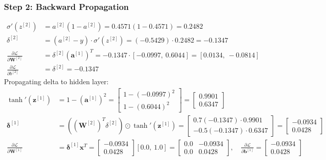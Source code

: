 \documentclass[11pt,a4paper]{article}
\begin{document}
\subsubsection{Step 2: Backward Propagation}
\begin{align*}
    \sigma'(z^{[2]}) &= a^{[2]}(1 - a^{[2]}) = 0.4571(1 - 0.4571) = 0.2482 \\
    \delta^{[2]} &= (a^{[2]} - y) \cdot \sigma'(z^{[2]}) = (-0.5429) \cdot 0.2482 = -0.1347 \\
    \frac{\partial \mathcal{L}}{\partial \mathbf{W}^{[2]}} &= \delta^{[2]} (\mathbf{a}^{[1]})^T = -0.1347 \cdot [-0.0997, \ 0.6044] = [0.0134, \ -0.0814] \\
    \frac{\partial \mathcal{L}}{\partial b^{[2]}} &= \delta^{[2]} = -0.1347
\end{align*}
Propagating delta to hidden layer:
\begin{align*}
    \tanh'(\mathbf{z}^{[1]}) &= 1 - (\mathbf{a}^{[1]})^2 = \begin{bmatrix} 1 - (-0.0997)^2 \\ 1 - (0.6044)^2 \end{bmatrix} = \begin{bmatrix} 0.9901 \\ 0.6347 \end{bmatrix} \\
    \boldsymbol{\delta}^{[1]} &= \left( (\mathbf{W}^{[2]})^T \delta^{[2]} \right) \odot \tanh'(\mathbf{z}^{[1]}) = \begin{bmatrix} 0.7(-0.1347) \cdot 0.9901 \\ -0.5(-0.1347) \cdot 0.6347 \end{bmatrix} = \begin{bmatrix} -0.0934 \\ 0.0428 \end{bmatrix} \\
    \frac{\partial \mathcal{L}}{\partial \mathbf{W}^{[1]}} &= \boldsymbol{\delta}^{[1]} \mathbf{x}^T = \begin{bmatrix} -0.0934 \\ 0.0428 \end{bmatrix} [0.0, \ 1.0] = \begin{bmatrix} 0.0 & -0.0934 \\ 0.0 & 0.0428 \end{bmatrix}, \quad \frac{\partial \mathcal{L}}{\partial \mathbf{b}^{[1]}} = \begin{bmatrix} -0.0934 \\ 0.0428 \end{bmatrix}
\end{align*}
\end{document}
